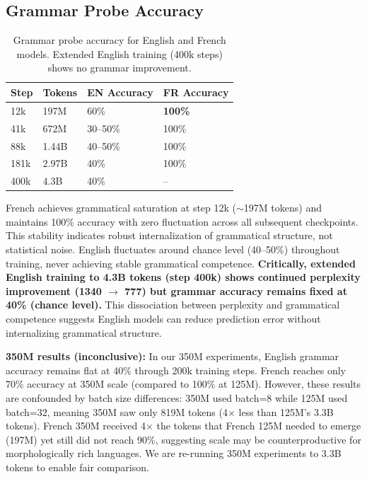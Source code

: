\documentclass[11pt,a4paper]{article}
\begin{document}
\subsection{Grammar Probe Accuracy}

\begin{table}[h]
\centering
\begin{tabular}{llll}
\toprule
Step & Tokens & EN Accuracy & FR Accuracy \\
\midrule
12k & 197M & 60\% & \textbf{100\%} \\
41k & 672M & 30--50\% & 100\% \\
88k & 1.44B & 40--50\% & 100\% \\
181k & 2.97B & 40\% & 100\% \\
400k & 4.3B & 40\% & -- \\
\bottomrule
\end{tabular}
\caption{Grammar probe accuracy for English and French models. Extended English training (400k steps) shows no grammar improvement.}
\label{tab:grammar}
\end{table}

French achieves grammatical saturation at step 12k ($\sim$197M tokens) and maintains 100\% accuracy with zero fluctuation across all subsequent checkpoints. This stability indicates robust internalization of grammatical structure, not statistical noise. English fluctuates around chance level (40--50\%) throughout training, never achieving stable grammatical competence. \textbf{Critically, extended English training to 4.3B tokens (step 400k) shows continued perplexity improvement (1340 $\rightarrow$ 777) but grammar accuracy remains fixed at 40\% (chance level).} This dissociation between perplexity and grammatical competence suggests English models can reduce prediction error without internalizing grammatical structure.

\textbf{350M results (inconclusive):} In our 350M experiments, English grammar accuracy remains flat at 40\% through 200k training steps. French reaches only 70\% accuracy at 350M scale (compared to 100\% at 125M). However, these results are confounded by batch size differences: 350M used batch=8 while 125M used batch=32, meaning 350M saw only 819M tokens (4$\times$ less than 125M's 3.3B tokens). French 350M received 4$\times$ the tokens that French 125M needed to emerge (197M) yet still did not reach 90\%, suggesting scale may be counterproductive for morphologically rich languages. We are re-running 350M experiments to 3.3B tokens to enable fair comparison.
\end{document}
